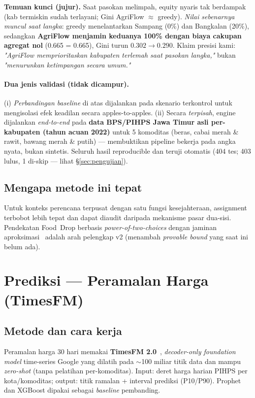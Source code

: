 \documentclass[11pt,a4paper]{article}
\begin{document}
\noindent\textbf{Temuan kunci (jujur).} Saat pasokan melimpah, equity nyaris tak berdampak (kab
termiskin sudah terlayani; Gini AgriFlow $\approx$ greedy). \emph{Nilai sebenarnya muncul saat
langka}: greedy menelantarkan Sampang (0\%) dan Bangkalan (20\%), sedangkan \textbf{AgriFlow
menjamin keduanya 100\% dengan biaya cakupan agregat nol} (0.665 = 0.665), Gini turun
$0.302\!\rightarrow\!0.290$. Klaim presisi kami: \emph{"AgriFlow memprioritaskan kabupaten
terlemah saat pasokan langka,"} bukan \emph{"menurunkan ketimpangan secara umum."}

\paragraph{Dua jenis validasi (tidak dicampur).} (i) \emph{Perbandingan baseline} di atas
dijalankan pada skenario terkontrol untuk mengisolasi efek keadilan secara apples-to-apples.
(ii) Secara \emph{terpisah}, engine dijalankan \emph{end-to-end} pada \textbf{data BPS/PIHPS Jawa
Timur asli per-kabupaten (tahun acuan 2022)} untuk 5 komoditas (beras, cabai merah \& rawit, bawang
merah \& putih) --- membuktikan pipeline bekerja pada angka nyata, bukan sintetis. Seluruh hasil
reproducible dan teruji otomatis (404 tes; 403 lulus, 1 di-skip --- lihat \S\ref{sec:pengujian}).

\subsection{Mengapa metode ini tepat}
Untuk konteks perencana terpusat dengan satu fungsi kesejahteraan, assignment terbobot lebih tepat
dan dapat diaudit daripada mekanisme pasar dua-sisi. Pendekatan Food~Drop berbasis
\emph{power-of-two-choices} dengan jaminan aproksimasi~\cite{diaby2024} adalah arah pelengkap v2
(menambah \emph{provable bound} yang saat ini belum ada).

\section{Prediksi --- Peramalan Harga (TimesFM)}

\subsection{Metode dan cara kerja}
Peramalan harga 30 hari memakai \textbf{TimesFM 2.0}~\cite{timesfm2023}, \emph{decoder-only
foundation model} time-series Google yang dilatih pada $\sim$100 miliar titik data dan mampu
\emph{zero-shot} (tanpa pelatihan per-komoditas). Input: deret harga harian PIHPS per kota/komoditas;
output: titik ramalan + interval prediksi (P10/P90). Prophet dan XGBoost dipakai sebagai
\emph{baseline} pembanding.
\end{document}
